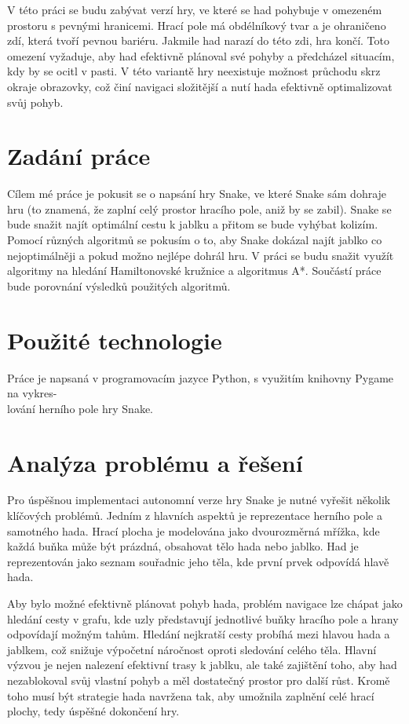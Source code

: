 V této práci se budu zabývat verzí hry, ve které se had pohybuje v omezeném prostoru s pevnými hranicemi. Hrací pole má obdélníkový tvar a je ohraničeno zdí, která tvoří pevnou bariéru. Jakmile had narazí do této zdi, hra končí. Toto omezení vyžaduje, aby had efektivně plánoval své pohyby a předcházel situacím, kdy by se ocitl v pasti. V této variantě hry neexistuje možnost průchodu skrz okraje obrazovky, což činí navigaci složitější a nutí hada efektivně optimalizovat svůj pohyb.

\section{Zadání práce}
Cílem mé práce je pokusit se o napsání hry Snake, ve které Snake sám dohraje hru (to znamená, že zaplní celý prostor hracího pole, aniž by se zabil). Snake se bude snažit najít optimální cestu k jablku a přitom se bude vyhýbat kolizím. Pomocí různých algoritmů se pokusím o to, aby Snake dokázal najít jablko co nejoptimálněji a pokud možno nejlépe dohrál hru. V práci se budu snažit využít algoritmy na hledání Hamiltonovské kružnice a algoritmus A*. Součástí práce bude porovnání výsledků použitých algoritmů.

\section{Použité technologie}
Práce je napsaná v programovacím jazyce Python, s využitím knihovny Pygame na vykres-\\lování herního pole hry Snake.

\section{Analýza problému a řešení}

Pro úspěšnou implementaci autonomní verze hry Snake je nutné vyřešit několik klíčových problémů. Jedním z hlavních aspektů je reprezentace herního pole a samotného hada. Hrací plocha je modelována jako dvourozměrná mřížka, kde každá buňka může být prázdná, obsahovat tělo hada nebo jablko. Had je reprezentován jako seznam souřadnic jeho těla, kde první prvek odpovídá hlavě hada.

Aby bylo možné efektivně plánovat pohyb hada, problém navigace lze chápat jako hledání cesty v grafu, kde uzly představují jednotlivé buňky hracího pole a hrany odpovídají možným tahům. Hledání nejkratší cesty probíhá mezi hlavou hada a jablkem, což snižuje výpočetní náročnost oproti sledování celého těla. Hlavní výzvou je nejen nalezení efektivní trasy k jablku, ale také zajištění toho, aby had nezablokoval svůj vlastní pohyb a měl dostatečný prostor pro další růst. Kromě toho musí být strategie hada navržena tak, aby umožnila zaplnění celé hrací plochy, tedy úspěšné dokončení hry.